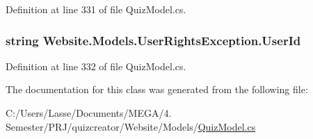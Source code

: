 Definition at line 331 of file Quiz\+Model.\+cs.

\hypertarget{class_website_1_1_models_1_1_user_rights_exception_a27aee9fbb61129a1f244fa850d0f6aa2}{}
\subsubsection[{User\+Id}]{\setlength{\rightskip}{0pt plus 5cm}string Website.\+Models.\+User\+Rights\+Exception.\+User\+Id\hspace{0.3cm}{\ttfamily [get]}}\label{class_website_1_1_models_1_1_user_rights_exception_a27aee9fbb61129a1f244fa850d0f6aa2}


Definition at line 332 of file Quiz\+Model.\+cs.



The documentation for this class was generated from the following file\+:\begin{DoxyCompactItemize}
\item 
C\+:/\+Users/\+Lasse/\+Documents/\+M\+E\+G\+A/4. Semester/\+P\+R\+J/quizcreator/\+Website/\+Models/\hyperlink{_quiz_model_8cs}{Quiz\+Model.\+cs}\end{DoxyCompactItemize}
